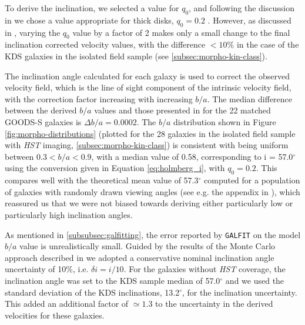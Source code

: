 \documentclass[fleqn,usenatbib]{mnras}
\begin{document}
\noindent
To derive the inclination, we selected a value for $q_{0}$, and following the discussion in \citep{Law2012a} we chose a value appropriate for thick disks, $q_{0} = 0.2$ \citep[e.g.][]{Epinat2012,Harrison2017}.
However, as discussed in \cite{Harrison2017}, varying the $q_{0}$ value by a factor of 2 makes only a small change to the final inclination corrected velocity values, with the difference $<10\%$ in the case of the KDS galaxies in the isolated field sample (see \cref{subsec:morpho-kin-class}).

The inclination angle calculated for each galaxy is used to correct the observed velocity field, which is the line of sight component of the intrinsic velocity field, with the correction factor increasing with increasing $b/a$.
The median difference between the derived $b/a$ values and those presented in \cite{VanderWel2012} for the 22 matched GOODS-S galaxies is $\Delta b/a = 0.0002$.
The $b/a$ distribution shown in Figure \ref{fig:morpho-distributions} (plotted for the 28 galaxies in the isolated field sample with {\em HST} imaging, \cref{subsec:morpho-kin-class}) is consistent with being uniform between $0.3 < b/a < 0.9$, with a median value of 0.58, corresponding to i = 57.0$^{\circ}$ using the conversion given in Equation \ref{eq:holmberg_i}, with $q_{0}=0.2$.
This compares well with the theoretical mean value of 57.3$^{\circ}$ computed for a population of galaxies with randomly drawn viewing angles (see e.g. the appendix in \citealt{Law2009}), which reassured us that we were not biased towards deriving either particularly low or particularly high inclination angles.

As mentioned in \cref{subsubsec:galfitting}, the error reported by {\tt GALFIT} on the model $b/a$ value is unrealistically small.
Guided by the results of the Monte Carlo approach described in \cite{Epinat2012} we adopted a conservative nominal inclination angle uncertainty of 10$\%$, i.e. $\delta i = i / 10$.
For the galaxies without {\em HST} coverage, the inclination angle was set to the KDS sample median of 57.0$^{\circ}$ and we used the standard deviation of the KDS inclinations, 13.2$^{\circ}$, for the inclination uncertainty.
This added an additional factor of $\simeq1.3$ to the uncertainty in the derived velocities for these galaxies.
\end{document}
